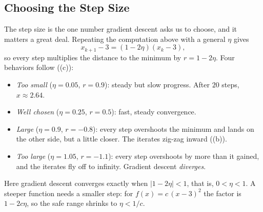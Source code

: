 \subsection{Choosing the Step Size}
\label{sec:ch02-step-size}

The step size is the one number gradient descent asks us to choose, and it
matters a great deal. Repeating the computation above with a general
$\eta$ gives
\[
  x_{k+1} - 3 = (1 - 2\eta)(x_k - 3),
\]
so every step multiplies the distance to the minimum by $r = 1 - 2\eta$.
Four behaviors follow ((c)):
\begin{itemize}
  \item \emph{Too small} ($\eta = 0.05$, $r = 0.9$): steady but slow
    progress. After $20$ steps, $x \approx 2.64$.
  \item \emph{Well chosen} ($\eta = 0.25$, $r = 0.5$): fast, steady
    convergence.
  \item \emph{Large} ($\eta = 0.9$, $r = -0.8$): every step overshoots the
    minimum and lands on the other side, but a little closer. The iterates
    zig-zag inward ((b)).
  \item \emph{Too large} ($\eta = 1.05$, $r = -1.1$): every step overshoots
    by more than it gained, and the iterates fly off to infinity. Gradient
    descent \emph{diverges}.
\end{itemize}
Here gradient descent converges exactly when $|1 - 2\eta| < 1$, that is,
$0 < \eta < 1$. A steeper function needs a smaller step: for
$f(x) = c\,(x - 3)^2$ the factor is $1 - 2c\eta$, so the safe range
shrinks to $\eta < 1/c$.

